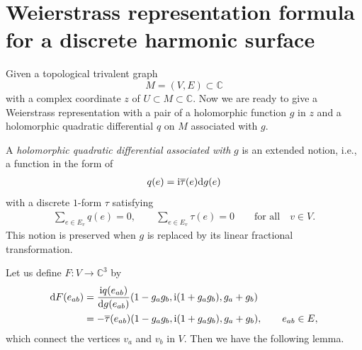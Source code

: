 \documentclass[pdftex]{sigma}
\newcommand{\C}{\mathbb{C}}
\newcommand{\ii}{{\mathrm{i}}}
\newcommand{\1}{{\bf 1}}
\numberwithin{equation}{section}
\begin{document}
\section[Weierstrass representation formula for a discrete harmonic surface]{Weierstrass representation formula\\ for a discrete harmonic surface}

Given a topological trivalent graph \[M=(V,E) \subset \C\]
 with a complex coordinate $z$ of $U \subset M \subset \C$.
Now we are ready to give a Weierstrass representation with a pair of a holomorphic function $g$ in $z$
and a holomorphic quadratic differential $q$ on $M$ associated with $g$.


A {\em holomorphic quadratic differential associated with} $g$ is an extended notion, i.e., a function in the form of
\begin{gather*}
 q(e)= \ii \overline{\tau}(e) {\rm d}g(e)
\end{gather*}
with a discrete $1$-form $\tau$ satisfying
\begin{gather*}
 \sum_{e \in E_v} q(e) =0,
 \qquad
 \sum_{e \in E_v} \tau(e) =0 \qquad \text{for all}\quad v \in V.
\end{gather*}
This notion is preserved when $g$ is replaced by its linear fractional transformation.

Let us define $F\colon V \to \C^3$ by
\begin{align*}
 {\rm d}F(e_{ab}) &= \frac{\ii q(e_{ab})}{{\rm d}g(e_{ab})}(1-g_ag_b, \ii(1+g_ag_b), g_a+g_b)\\
 &=-\overline{\tau}(e_{ab}) (1-g_ag_b, \ii(1+g_ag_b), g_a+g_b),\qquad e_{ab} \in E,
\end{align*}
which connect the vertices $v_a$ and $v_b$ in $V$. Then we have the following lemma.
\end{document}

